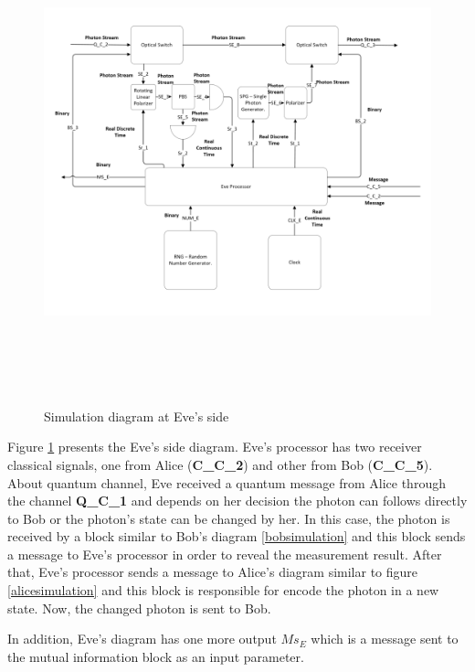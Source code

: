 \begin{enumerate}
\begin{figure}[h]
	\centering
	\includegraphics[width=1.1\textwidth, height=14cm]{./sdf/bb84_with_discrete_variables/figures/eve_simulation.png}
	\caption{Simulation diagram at Eve's side}\label{evesimulation}
\end{figure}

Figure \ref{evesimulation} presents the Eve's side diagram. Eve's processor has two receiver classical signals, one from Alice (\textbf{C\_C\_2}) and other from Bob (\textbf{C\_C\_5}). About quantum channel, Eve received a quantum message from Alice through the channel \textbf{Q\_C\_1} and depends on her decision the photon can follows directly to Bob or the photon's state can be changed by her. In this case, the photon is received by a block similar to Bob's diagram \ref{bobsimulation} and this block sends a message to Eve's processor in order to reveal the measurement result. After that, Eve's processor sends a message to Alice's diagram similar to figure \ref{alicesimulation} and this block is responsible for encode the photon in a new state. Now, the changed photon is sent to Bob.

In addition, Eve's diagram has one more output $Ms_{E}$ which is a message sent to the mutual information block as an input parameter.


\end{enumerate}
